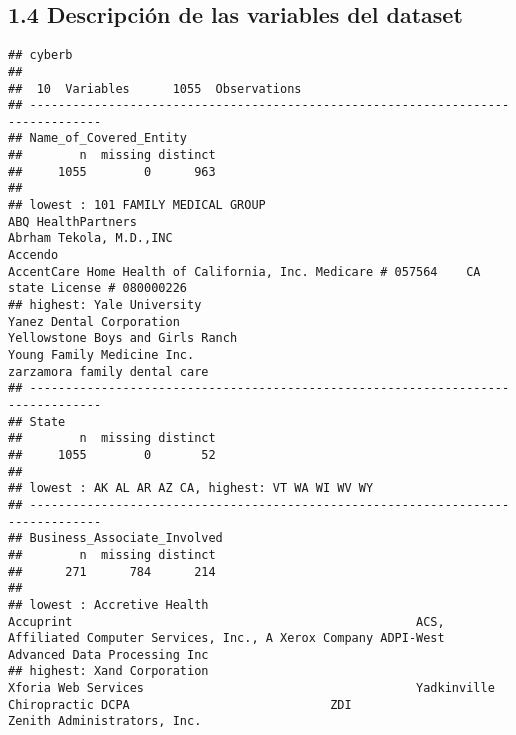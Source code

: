 \documentclass[
]{article}
\begin{document}
\hypertarget{descripciuxf3n-de-las-variables-del-dataset}{%
\subsection{1.4 Descripción de las variables del
dataset}\label{descripciuxf3n-de-las-variables-del-dataset}}

\begin{verbatim}
## cyberb 
## 
##  10  Variables      1055  Observations
## --------------------------------------------------------------------------------
## Name_of_Covered_Entity 
##        n  missing distinct 
##     1055        0      963 
## 
## lowest : 101 FAMILY MEDICAL GROUP                                                                     ABQ HealthPartners                                                                           Abrham Tekola, M.D.,INC                                                                      Accendo                                                                                      AccentCare Home Health of California, Inc. Medicare # 057564    CA state License # 080000226
## highest: Yale University                                                                              Yanez Dental Corporation                                                                     Yellowstone Boys and Girls Ranch                                                             Young Family Medicine Inc.                                                                   zarzamora family dental care                                                                
## --------------------------------------------------------------------------------
## State 
##        n  missing distinct 
##     1055        0       52 
## 
## lowest : AK AL AR AZ CA, highest: VT WA WI WV WY
## --------------------------------------------------------------------------------
## Business_Associate_Involved 
##        n  missing distinct 
##      271      784      214 
## 
## lowest : Accretive Health                                         Accuprint                                                ACS, Affiliated Computer Services, Inc., A Xerox Company ADPI-West                                                Advanced Data Processing Inc                            
## highest: Xand Corporation                                         Xforia Web Services                                      Yadkinville Chiropractic DCPA                            ZDI                                                      Zenith Administrators, Inc.                             

\end{verbatim}
\end{document}
